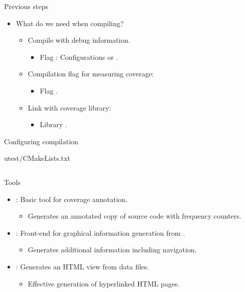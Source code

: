 \begin{frame}[t]{Previous steps}
\begin{itemize}
  \item What do we need when compiling?
    \begin{itemize}
      \item Compile with debug information.
        \begin{itemize}
          \item Flag : Configurations  or .
        \end{itemize}
      \item Compilation flag for measuring coverage:
        \begin{itemize}
          \item Flag .
        \end{itemize}
      \item Link with coverage library:
        \begin{itemize}
          \item Library .
        \end{itemize}
    \end{itemize}
\end{itemize}
\end{frame}

\begin{frame}[t,fragile]{Configuring compilation}
\begin{block}{utest/CMakeLists.txt}\tiny
\inputminted[lastline=18]{cmake}{examples/vector3/utest/CMakeLists.txt}
\end{block}
\end{frame}

\begin{frame}[t]{Tools}
\begin{itemize}
  \item {}: Basic tool for coverage annotation.
    \begin{itemize}
      \item Generates an annotated copy of source code with frequency counters.
    \end{itemize}
  \item {}: Front-end for graphical information generation from .
    \begin{itemize}
      \item Generates additional information including navigation.
    \end{itemize}
  \item {}: Generates an HTML view from  data files.
    \begin{itemize}
      \item Effective generation of hyperlinked HTML pages.
    \end{itemize}
\end{itemize}
\end{frame}

